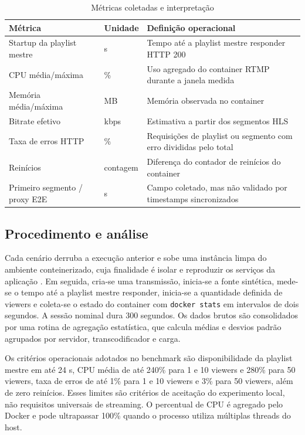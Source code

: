 \begin{table}[H]
\centering
\caption{Métricas coletadas e interpretação}
\begin{tabularx}{\textwidth}{@{}lXX@{}}
\toprule
Métrica & Unidade & Definição operacional \\
\midrule
Startup da playlist mestre & s & Tempo até a playlist mestre responder HTTP 200 \\
CPU média/máxima & \% & Uso agregado do container RTMP durante a janela medida \\
Memória média/máxima & MB & Memória observada no container \\
Bitrate efetivo & kbps & Estimativa a partir dos segmentos HLS \\
Taxa de erros HTTP & \% & Requisições de playlist ou segmento com erro divididas pelo total \\
Reinícios & contagem & Diferença do contador de reinícios do container \\
Primeiro segmento / proxy E2E & s & Campo coletado, mas não validado por timestamps sincronizados \\
\bottomrule
\end{tabularx}
\end{table}

\subsection{Procedimento e análise}

Cada cenário derruba a execução anterior e sobe uma instância limpa do ambiente conteinerizado, cuja finalidade é isolar e reproduzir os serviços da aplicação \citep{docker}. Em seguida, cria-se uma transmissão, inicia-se a fonte sintética, mede-se o tempo até a playlist mestre responder, inicia-se a quantidade definida de viewers e coleta-se o estado do container com \texttt{docker stats} em intervalos de dois segundos. A sessão nominal dura 300 segundos. Os dados brutos são consolidados por uma rotina de agregação estatística, que calcula médias e desvios padrão agrupados por servidor, transcodificador e carga.

Os critérios operacionais adotados no benchmark são disponibilidade da playlist mestre em até 24 s, CPU média de até 240\% para 1 e 10 viewers e 280\% para 50 viewers, taxa de erros de até 1\% para 1 e 10 viewers e 3\% para 50 viewers, além de zero reinícios. Esses limites são critérios de aceitação do experimento local, não requisitos universais de streaming. O percentual de CPU é agregado pelo Docker e pode ultrapassar 100\% quando o processo utiliza múltiplas threads do host.

